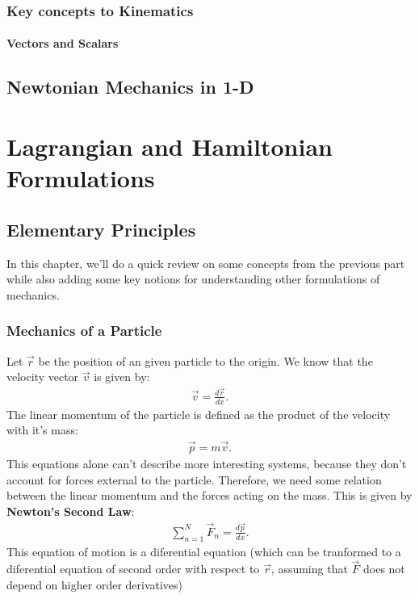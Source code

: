 \documentclass[english, a4paper,12pt]{Iart}
\theoremstyle{plain} %
\theoremstyle{remark}
\theoremstyle{definition}
\begin{document}
		\section{Key concepts to Kinematics}
			\subsection{Vectors and Scalars}
	
							


	\chapter{Newtonian Mechanics in 1-D}
		
	
	
\part{Lagrangian and Hamiltonian Formulations}
	\chapter{Elementary Principles}
		In this chapter, we'll do a quick review on some concepts from the previous part while also adding	some key notions for understanding other formulations of mechanics.
		\section{Mechanics of a Particle}
			Let $\vec{r}$ be the position of an given particle to the origin. We know that the
			velocity vector $\vec{v}$ is given by:
			\begin{align*}
				\vec{v} =\frac{d\vec{r}}{dx} 
			.\end{align*}
			The linear momentum of the particle is defined as the product of the velocity with
			it's mass:
			\begin{align*}
				\vec{p} = m\vec{v}
			.\end{align*}		
			This equations alone can't describe more interesting systems, because they don't
			account for forces external to the particle. Therefore, we need some relation between
			the linear momentum and the forces acting on the mass. This is given by
			\textbf{Newton's Second Law}:
			\begin{align*}
				\sum_{n=1}^{N}\vec{F}_n = \frac{d\vec{p}}{dx}
			.\end{align*}
			This equation of motion is a diferential equation (which can be tranformed to a
			diferential equation of second order with respect to $\vec{r}$, assuming that
			$\vec{F}$ does not depend on higher order
			derivatives)\\
			
\end{document}
